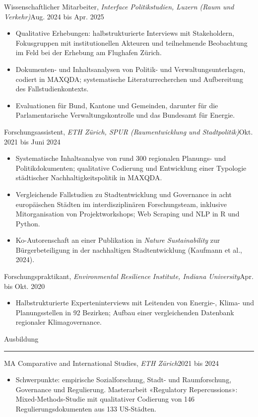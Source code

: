 \documentclass[10pt,a4paper]{article}
\newcommand{\cvsection}[1]{%
  \vspace{0.38em}\par
  {\color{cvblue}\large #1}\par
  \vspace{-0.28em}\textcolor{cvblue}{\rule{\linewidth}{0.6pt}}\par
  \vspace{0.26em}}
\newcommand{\cventry}[3]{\vspace{0.4em}#1, \textit{#2}\hfill #3\par\vspace{1pt}}
\begin{document}
\cventry{Wissenschaftlicher Mitarbeiter}{Interface Politikstudien, Luzern (Raum und Verkehr)}{Aug. 2024 bis Apr. 2025}
\begin{itemize}
\item Qualitative Erhebungen: halbstrukturierte Interviews mit Stakeholdern, Fokusgruppen mit institutionellen Akteuren und teilnehmende Beobachtung im Feld bei der Erhebung am Flughafen Zürich.
\item Dokumenten- und Inhaltsanalysen von Politik- und Verwaltungsunterlagen, codiert in MAXQDA; systematische Literaturrecherchen und Aufbereitung des Fallstudienkontexts.
\item Evaluationen für Bund, Kantone und Gemeinden, darunter für die Parlamentarische Verwaltungskontrolle und das Bundesamt für Energie.
\end{itemize}

\cventry{Forschungsassistent}{ETH Zürich, SPUR (Raumentwicklung und Stadtpolitik)}{Okt. 2021 bis Juni 2024}
\begin{itemize}
\item Systematische Inhaltsanalyse von rund 300 regionalen Planungs- und Politikdokumenten; qualitative Codierung und Entwicklung einer Typologie städtischer Nachhaltigkeitspolitik in MAXQDA.
\item Vergleichende Fallstudien zu Stadtentwicklung und Governance in acht europäischen Städten im interdisziplinären Forschungsteam, inklusive Mitorganisation von Projektworkshops; Web Scraping und NLP in R und Python.
\item Ko-Autorenschaft an einer Publikation in \textit{Nature Sustainability} zur Bürgerbeteiligung in der nachhaltigen Stadtentwicklung (Kaufmann et al., 2024).
\end{itemize}

\cventry{Forschungspraktikant}{Environmental Resilience Institute, Indiana University}{Apr. bis Okt. 2020}
\begin{itemize}
\item Halbstrukturierte Experteninterviews mit Leitenden von Energie-, Klima- und Planungsstellen in 92 Bezirken; Aufbau einer vergleichenden Datenbank regionaler Klimagovernance.
\end{itemize}

\cvsection{Ausbildung}

\cventry{MA Comparative and International Studies}{ETH Zürich}{2021 bis 2024}
\begin{itemize}
\item Schwerpunkte: empirische Sozialforschung, Stadt- und Raumforschung, Governance und Regulierung. Masterarbeit «Regulatory Repercussions»: Mixed-Methods-Studie mit qualitativer Codierung von 146 Regulierungsdokumenten aus 133 US-Städten.
\end{itemize}
\end{document}
